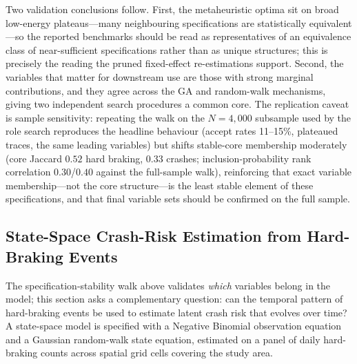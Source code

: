 \documentclass[letterpaper,8pt]{extarticle}  %
\begin{document}
\begin{doublespacing}
\begin{linenumbers}
Two validation conclusions follow. First, the metaheuristic optima sit on broad low-energy plateaus---many neighbouring specifications are statistically equivalent---so the reported benchmarks should be read as representatives of an equivalence class of near-sufficient specifications rather than as unique structures; this is precisely the reading the pruned fixed-effect re-estimations support. Second, the variables that matter for downstream use are those with strong marginal contributions, and they agree across the GA and random-walk mechanisms, giving two independent search procedures a common core. The replication caveat is sample sensitivity: repeating the walk on the $N=4{,}000$ subsample used by the role search reproduces the headline behaviour (accept rates 11--15\%, plateaued traces, the same leading variables) but shifts stable-core membership moderately (core Jaccard $0.52$ hard braking, $0.33$ crashes; inclusion-probability rank correlation $0.30$/$0.40$ against the full-sample walk), reinforcing that exact variable membership---not the core structure---is the least stable element of these specifications, and that final variable sets should be confirmed on the full sample.





\FloatBarrier

\subsection{State-Space Crash-Risk Estimation from Hard-Braking Events}\label{sec:state-space}

The specification-stability walk above validates \emph{which} variables belong in the model; this section asks a complementary question: can the temporal pattern of hard-braking events be used to estimate latent crash risk that evolves over time? A state-space model is specified with a Negative Binomial observation equation and a Gaussian random-walk state equation, estimated on a panel of daily hard-braking counts across spatial grid cells covering the study area.


\end{linenumbers}
\end{doublespacing}
\end{document}
